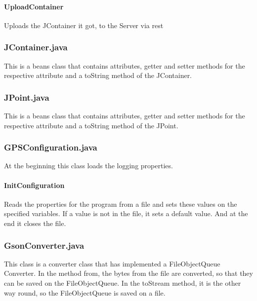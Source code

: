 \paragraph{UploadContainer}
Uploads the JContainer it got, to the Server via \gls{rest} 
\subsubsection{JContainer.java}
This is a beans class that contains attributes, getter and setter methods for the respective attribute and a toString method of the JContainer.
\subsubsection{JPoint.java}
This is a beans class that contains attributes, getter and setter methods for the respective attribute and a toString method of the JPoint.
\subsubsection{GPSConfiguration.java}
At the beginning this class loads the logging properties.
\paragraph{InitConfiguration}
Reads the properties for the program from a file and sets these values on the specified variables. If a value is not in the file, it sets a default value. And at the end it closes the file.
\subsubsection{GsonConverter.java}
This class is a converter class that has implemented a FileObjectQueue Converter. In the method from, the bytes from the file are converted, so that they can be saved on the FileObjectQueue. In the toStream method, it is the other way round, so the FileObjectQueue is saved on a file.
